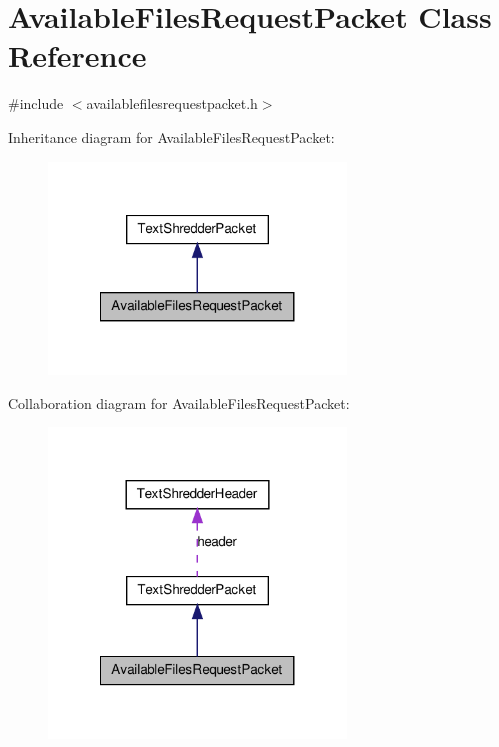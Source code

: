 \hypertarget{class_available_files_request_packet}{
\section{AvailableFilesRequestPacket Class Reference}
\label{class_available_files_request_packet}
}


{\ttfamily \#include $<$availablefilesrequestpacket.h$>$}



Inheritance diagram for AvailableFilesRequestPacket:\nopagebreak
\begin{figure}[H]
\begin{center}
\leavevmode
\includegraphics[width=224pt]{class_available_files_request_packet__inherit__graph}
\end{center}
\end{figure}


Collaboration diagram for AvailableFilesRequestPacket:\nopagebreak
\begin{figure}[H]
\begin{center}
\leavevmode
\includegraphics[width=224pt]{class_available_files_request_packet__coll__graph}
\end{center}
\end{figure}
